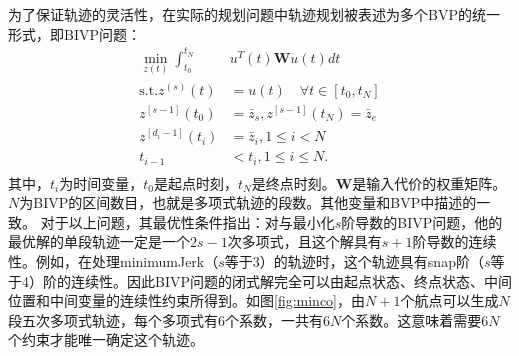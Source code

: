 \documentclass[master,academic]{ysuthesis} %
\begin{document}
		为了保证轨迹的灵活性，在实际的规划问题中轨迹规划被表述为多个BVP的统一形式，即BIVP问题：
		\begin{equation}
			\begin{aligned}
				\min_{z(t)}\int_{t_0}^{t_N}&u^T(t)\bm{W}u(t)dt\\
				\text{s.t}.z^{( s )}(t) &=u(t) \quad \forall t\in \left[ t_0,t_N \right]\\
				z^{\left[ s-1 \right]}( t_0 ) &=\bar{z}_s,z^{\left[ s-1 \right]}( t_N ) =\bar{z}_e\\
				z^{\left[ d_i-1 \right]}( t_i ) &=\bar{z}_i,1\leq i<N\\
				t_{i-1}&<t_i,1\leq i\leq N.\\
			\end{aligned}
		\end{equation}
		其中，$t_i$为时间变量，$t_0$是起点时刻，$t_N$是终点时刻。$\bm{W}$是输入代价的权重矩阵。$N$为BIVP的区间数目，也就是多项式轨迹的段数。其他变量和BVP中描述的一致。
		对于以上问题，其最优性条件指出：对与最小化$s$阶导数的BIVP问题，他的最优解的单段轨迹一定是一个$2s-1$次多项式，且这个解具有$s+1$阶导数的连续性。例如，在处理minimumJerk（$s$等于3）的轨迹时，这个轨迹具有snap阶（$s$等于4）阶的连续性。因此BIVP问题的闭式解完全可以由起点状态、终点状态、中间位置和中间变量的连续性约束所得到。如图\ref{fig:minco}，由$N+1$个航点可以生成$N$段五次多项式轨迹，每个多项式有6个系数，一共有$6N$个系数。这意味着需要$6N$个约束才能唯一确定这个轨迹。
	
\end{document}
